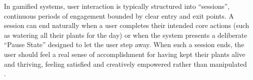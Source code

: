 In gamified systems, user interaction is typically structured into ``sessions'', continuous periods of engagement bounded by clear entry and exit points. A session can end naturally when a user completes their intended core actions (such as watering all their plants for the day) or when the system presents a deliberate ``Pause State'' designed to let the user step away. When such a session ends, the user should feel a real sense of accomplishment for having kept their plants alive and thriving, feeling satisfied and creatively empowered rather than manipulated \cite{chouGamification2015}.
